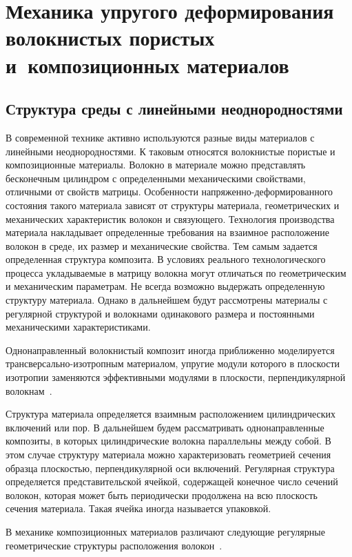 
\chapter{Механика упругого деформирования волокнистых пористых и~композиционных материалов}

\section{Структура среды с линейными неоднородностями}

В современной технике активно используются разные виды материалов с линейными неоднородностями. К таковым относятся волокнистые пористые и композиционные материалы. Волокно в материале можно представлять бесконечным цилиндром с определенными механическими свойствами, отличными от свойств матрицы. Особенности напряженно-деформированного состояния такого материала зависят от структуры материала, геометрических и механических характеристик волокон и связующего. Технология производства материала накладывает определенные требования на взаимное расположение волокон в среде, их размер и механические свойства. Тем самым задается определенная структура композита. В условиях реального технологического процесса укладываемые в матрицу волокна могут отличаться по геометрическим и механическим параметрам. Не всегда возможно выдержать определенную структуру материала. Однако в дальнейшем будут рассмотрены материалы с регулярной структурой и волокнами одинакового размера и постоянными механическими характеристиками.

Однонаправленный волокнистый композит иногда приближенно моделируется трансверсально-изотропным материалом, упругие модули которого в плоскости изотропии заменяются эффективными модулями в плоскости, перпендикулярной волокнам~\cite{Vanin1985, Lekhnitskiy}.

Структура материала определяется взаимным расположением цилиндрических включений или пор. В дальнейшем будем рассматривать однонаправленные композиты, в которых цилиндрические волокна параллельны между собой. В этом случае структуру материала можно характеризовать геометрией сечения образца плоскостью, перпендикулярной оси включений. Регулярная структура определяется представительской ячейкой, содержащей конечное число сечений волокон, которая может быть периодически продолжена на всю плоскость сечения материала. Такая ячейка иногда называется упаковкой.

В механике композиционных материалов различают следующие регулярные геометрические структуры расположения волокон~\cite{Vanin1985}.

